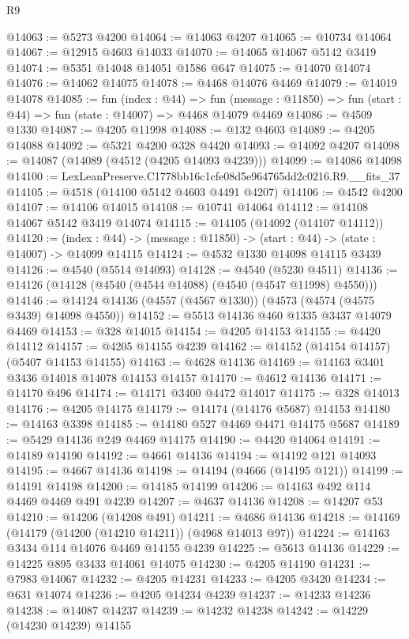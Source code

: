 \begin{lexlean}{R9}
\begin{coremodule}
@14063 := @5273 @4200
@14064 := @14063 @4207
@14065 := @10734 @14064
@14067 := @12915 @4603 @14033
@14070 := @14065 @14067 @5142 @3419
@14074 := @5351 @14048 @14051 @1586 @647
@14075 := @14070 @14074
@14076 := @14062 @14075
@14078 := @4468 @14076 @4469
@14079 := @14019 @14078
@14085 := fun (index : @44) =>
  fun (message : @11850) => fun (start : @44) => fun (state : @14007) => @4468 @14079 @4469
@14086 := @4509 @1330
@14087 := @4205 @11998
@14088 := @132 @4603
@14089 := @4205 @14088
@14092 := @5321 @4200 @328 @4420
@14093 := @14092 @4207
@14098 := @14087 (@14089 (@4512 (@4205 @14093 @4239)))
@14099 := @14086 @14098
@14100 := LexLeanPreserve.C1778bb16c1cfe08d5e964765dd2c0216.R9.__fits_37
@14105 := @4518 (@14100 @5142 @4603 @4491 @4207)
@14106 := @4542 @4200
@14107 := @14106 @14015
@14108 := @10741 @14064
@14112 := @14108 @14067 @5142 @3419 @14074
@14115 := @14105 (@14092 (@14107 @14112))
@14120 := (index : @44) -> (message : @11850) -> (start : @44) -> (state : @14007) -> @14099 @14115
@14124 := @4532 @1330 @14098 @14115 @3439
@14126 := @4540 (@5514 @14093)
@14128 := @4540 (@5230 @4511)
@14136 := @14126 (@14128 (@4540 (@4544 @14088) (@4540 (@4547 @11998) @4550)))
@14146 := @14124 @14136 (@4557 (@4567 @1330)) (@4573 (@4574 (@4575 @3439) @14098 @4550))
@14152 := @5513 @14136 @460 @1335 @3437 @14079 @4469
@14153 := @328 @14015
@14154 := @4205 @14153
@14155 := @4420 @14112
@14157 := @4205 @14155 @4239
@14162 := @14152 (@14154 @14157) (@5407 @14153 @14155)
@14163 := @4628 @14136
@14169 := @14163 @3401 @3436 @14018 @14078 @14153 @14157
@14170 := @4612 @14136
@14171 := @14170 @496
@14174 := @14171 @3400 @4472 @14017
@14175 := @328 @14013
@14176 := @4205 @14175
@14179 := @14174 (@14176 @5687) @14153
@14180 := @14163 @3398
@14185 := @14180 @527 @4469 @4471 @14175 @5687
@14189 := @5429 @14136 @249 @4469 @14175
@14190 := @4420 @14064
@14191 := @14189 @14190
@14192 := @4661 @14136
@14194 := @14192 @121 @14093
@14195 := @4667 @14136
@14198 := @14194 (@4666 (@14195 @121))
@14199 := @14191 @14198
@14200 := @14185 @14199
@14206 := @14163 @492 @114 @4469 @4469 @491 @4239
@14207 := @4637 @14136
@14208 := @14207 @53
@14210 := @14206 (@14208 @491)
@14211 := @4686 @14136
@14218 := @14169 (@14179 (@14200 (@14210 @14211)) (@4968 @14013 @97))
@14224 := @14163 @3434 @114 @14076 @4469 @14155 @4239
@14225 := @5613 @14136
@14229 := @14225 @895 @3433 @14061 @14075
@14230 := @4205 @14190
@14231 := @7983 @14067
@14232 := @4205 @14231
@14233 := @4205 @3420
@14234 := @631 @14074
@14236 := @4205 @14234 @4239
@14237 := @14233 @14236
@14238 := @14087 @14237
@14239 := @14232 @14238
@14242 := @14229 (@14230 @14239) @14155

\end{coremodule}
\end{lexlean}
